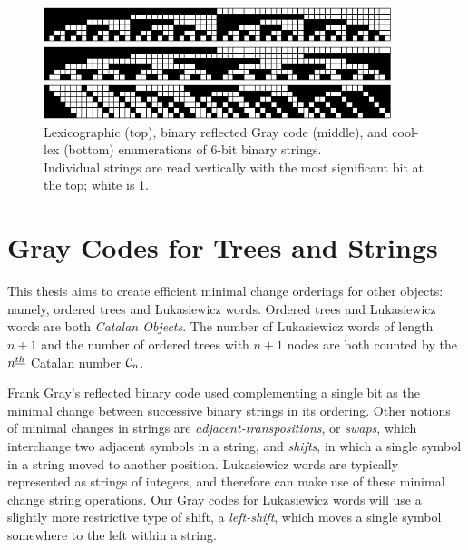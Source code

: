 \begin{figure}
    \centering
\includegraphics[width=4in]{BLX6-cropped.pdf} 

\includegraphics[width=4in]{BRGC6-cropped.pdf} 

\includegraphics[width=4in]{BCLX6-cropped.pdf} 

    \caption{Lexicographic (top), binary reflected Gray code (middle), and cool-lex (bottom) enumerations of 6-bit binary strings. \\ 
    Individual strings are read vertically with the most significant bit at the top; white is 1.
    }
    \label{binary}
\end{figure}

\section{Gray Codes for Trees and Strings} \label{sec:intro_Graycodes}

This thesis aims to create efficient minimal change orderings for other objects: namely, ordered trees and Lukasiewicz words.  Ordered trees and Lukasiewicz words are both \emph{Catalan Objects}.  The number of Lukasiewicz words of length $n+1$ and the number of ordered trees with $n+1$ nodes are both counted by the $n^{\underline{th}}$ Catalan number $\mathcal{C}_n$.  

Frank Gray's reflected binary code used complementing a single bit as the minimal change between successive binary strings in its ordering.  Other notions of minimal changes in strings are \emph{adjacent-transpositions}, or \emph{swaps}, which interchange two adjacent symbols in a string, and \emph{shifts}, in which a single symbol in a string moved to another position. Lukasiewicz words are typically represented as strings of integers, and therefore can make use of these minimal change string operations.  Our Gray codes for Lukasiewicz words will use a slightly more restrictive type of shift, a \emph{left-shift}, which moves a single symbol somewhere to the left within a string. 



